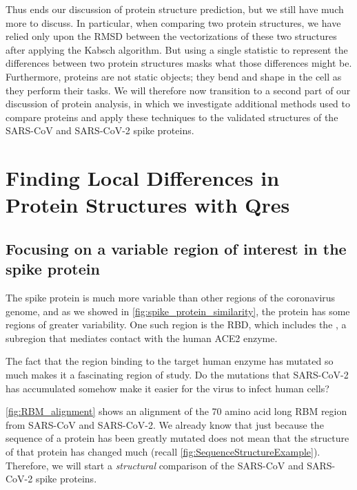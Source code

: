Thus ends our discussion of protein structure prediction, but we still have much more to discuss. In particular, when comparing two protein structures, we have relied only upon the RMSD between the vectorizations of these two structures after applying the Kabsch algorithm. But using a single statistic to represent the differences between two protein structures masks what those differences might be. Furthermore, proteins are not static objects; they bend and shape in the cell as they perform their tasks. We will therefore now transition to a second part of our discussion of protein analysis, in which we investigate additional methods used to compare proteins and apply these techniques to the validated structures of the SARS-CoV and SARS-CoV-2 spike proteins.\\

\FloatBarrier
{}

\section{Finding Local Differences in Protein Structures with Qres}
\label{sec:multiseq}

\FloatBarrier
{}
\subsection{Focusing on a variable region of interest in the spike protein}

The spike protein is much more variable than other regions of the coronavirus genome, and as we showed in \autoref{fig:spike_protein_similarity}, the protein has some regions of greater variability.  One such region is the RBD, which includes the , a subregion that mediates contact with the human ACE2 enzyme.

The fact that the region binding to the target human enzyme has mutated so much makes it a fascinating region of study. Do the mutations that SARS-CoV-2 has accumulated somehow make it easier for the virus to infect human cells?

\autoref{fig:RBM_alignment} shows an alignment of the 70 amino acid long RBM region from SARS-CoV and SARS-CoV-2. We already know that just because the sequence of a protein has been greatly mutated does not mean that the structure of that protein has changed much (recall \autoref{fig:SequenceStructureExample}). Therefore, we will start a \textit{structural} comparison of the SARS-CoV and SARS-CoV-2 spike proteins.\\

